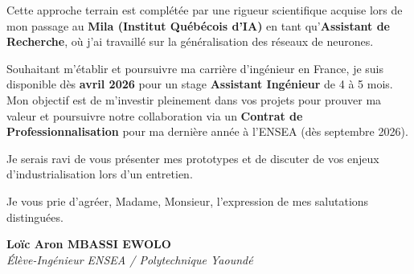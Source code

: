 \documentclass[a4paper,11pt]{article}
\begin{document}
Cette approche terrain est complétée par une rigueur scientifique acquise lors de mon passage au \textbf{Mila (Institut Québécois d'IA)} en tant qu'\textbf{Assistant de Recherche}, où j'ai travaillé sur la généralisation des réseaux de neurones.

Souhaitant m'établir et poursuivre ma carrière d'ingénieur en France, je suis disponible dès \textbf{avril 2026} pour un stage \textbf{Assistant Ingénieur} de 4 à 5 mois. Mon objectif est de m'investir pleinement dans vos projets pour prouver ma valeur et poursuivre notre collaboration via un \textbf{Contrat de Professionnalisation} pour ma dernière année à l'ENSEA (dès septembre 2026).

Je serais ravi de vous présenter mes prototypes et de discuter de vos enjeux d'industrialisation lors d'un entretien.

Je vous prie d'agréer, Madame, Monsieur, l'expression de mes salutations distinguées.

\vspace{1cm}

\textbf{Loïc Aron MBASSI EWOLO}\\
\textit{Élève-Ingénieur ENSEA / Polytechnique Yaoundé}
\end{document}
